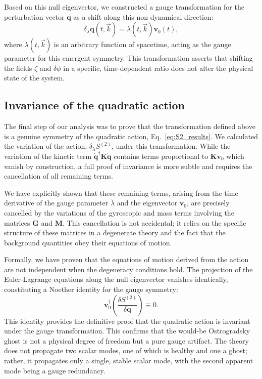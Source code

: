 \documentclass[twocolumn]{aastex631}
\begin{document}
Based on this null eigenvector, we constructed a gauge transformation for the perturbation vector $\mathbf{q}$ as a shift along this non-dynamical direction:
\begin{equation}
\delta_\lambda \mathbf{q}(t, \vec{k}) = \lambda(t, \vec{k}) \mathbf{v}_0(t),
\end{equation}
where $\lambda(t, \vec{k})$ is an arbitrary function of spacetime, acting as the gauge parameter for this emergent symmetry. This transformation asserts that shifting the fields $\zeta$ and $\delta\phi$ in a specific, time-dependent ratio does not alter the physical state of the system.

\subsection{Invariance of the quadratic action}

The final step of our analysis was to prove that the transformation defined above is a genuine symmetry of the quadratic action, Eq.~\eqref{eq:S2_results}. We calculated the variation of the action, $\delta_\lambda S^{(2)}$, under this transformation. While the variation of the kinetic term $\dot{\mathbf{q}}^\dagger \mathbf{K} \dot{\mathbf{q}}$ contains terms proportional to $\mathbf{K}\mathbf{v}_0$ which vanish by construction, a full proof of invariance is more subtle and requires the cancellation of all remaining terms.

We have explicitly shown that these remaining terms, arising from the time derivative of the gauge parameter $\dot{\lambda}$ and the eigenvector $\dot{\mathbf{v}}_0$, are precisely cancelled by the variations of the gyroscopic and mass terms involving the matrices $\mathbf{G}$ and $\mathbf{M}$. This cancellation is not accidental; it relies on the specific structure of these matrices in a degenerate theory and the fact that the background quantities obey their equations of motion.

Formally, we have proven that the equations of motion derived from the action are not independent when the degeneracy conditions hold. The projection of the Euler-Lagrange equations along the null eigenvector vanishes identically, constituting a Noether identity for the gauge symmetry:
\begin{equation}
\mathbf{v}_0^\dagger \left( \frac{\delta S^{(2)}}{\delta \mathbf{q}} \right) \equiv 0.
\end{equation}
This identity provides the definitive proof that the quadratic action is invariant under the gauge transformation. This confirms that the would-be Ostrogradsky ghost is not a physical degree of freedom but a pure gauge artifact. The theory does not propagate two scalar modes, one of which is healthy and one a ghost; rather, it propagates only a single, stable scalar mode, with the second apparent mode being a gauge redundancy.
\end{document}
